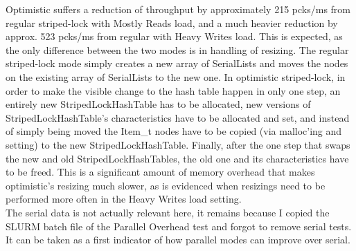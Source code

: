 \documentclass{article}
\begin{document}
\begin{adjustwidth}{-2cm}{-2cm}
Optimistic suffers a reduction of throughput by approximately 215 pcks/ms from regular striped-lock with Mostly Reads load, and a much heavier reduction by approx. 523 pcks/ms from regular with Heavy Writes load. This is expected, as the only difference between the two modes is in handling of resizing. The regular striped-lock mode simply creates a new array of SerialLists and moves the nodes on the existing array of SerialLists to the new one. In optimistic striped-lock, in order to make the visible change to the hash table happen in only one step, an entirely new StripedLockHashTable has to be allocated, new versions of StripedLockHashTable's characteristics have to be allocated and set, and instead of simply being moved the Item\_t nodes have to be copied (via malloc'ing and setting) to the new StripedLockHashTable. Finally, after the one step that swaps the new and old StripedLockHashTables, the old one and its characteristics have to be freed. This is a significant amount of memory overhead that makes optimistic's resizing much slower, as is evidenced when resizings need to be performed more often in the Heavy Writes load setting.\\
The serial data is not actually relevant here, it remains because I copied the SLURM batch file of the Parallel Overhead test and forgot to remove serial tests. It can be taken as a first indicator of how parallel modes can improve over serial.

\end{adjustwidth}
\end{document}
